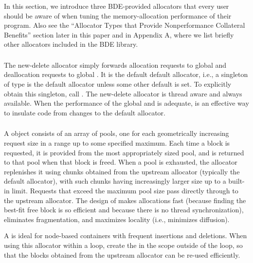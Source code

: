 In this section, we introduce three BDE-provided allocators that every user
should be aware of when tuning the memory-allocation performance of their
program. Also see the “Allocator Types that Provide Nonperformance Collateral
Benefits” section later in this paper and in Appendix A, where we list briefly
other allocators included in the BDE library.

\subsubsection{}

The new-delete allocator simply forwards allocation requests to global 
and deallocation requests to global . It is the default
default allocator, i.e., a singleton of type  is the
default allocator unless some other default is set. To explicitly obtain this
singleton, call . The new-delete
allocator is thread aware and always available. When the performance of the
global  and  is adequate,  is an effective
way to insulate code from changes to the default allocator.

\subsubsection{}

A  object consists of an array of pools, one for each
geometrically increasing request size in a range up to some specified
maximum. Each time a block is requested, it is provided from the most
appropriately sized pool, and is returned to that pool when that block is freed.
When a pool is exhausted, the allocator replenishes it using chunks obtained
from the upstream allocator (typically the default allocator), with such chunks
having increasingly larger size up to a built-in limit. Requests that exceed the
maximum pool size pass directly through to the upstream allocator. The design
of  makes allocations fast (because finding the
best-fit free block is so efficient and because there is no thread
synchronization), eliminates fragmentation, and maximizes locality (i.e.,
minimizes diffusion).

A  is ideal for node-based containers with frequent
insertions and deletions. When using this allocator within a loop, create the
 in the scope outside of the loop, so that the blocks
obtained from the upstream allocator can be re-used efficiently.

